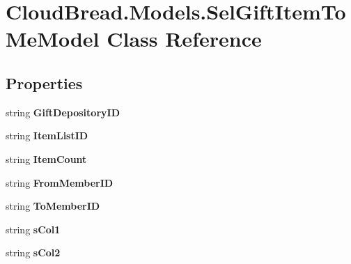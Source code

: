 \hypertarget{a00089}{}\section{Cloud\+Bread.\+Models.\+Sel\+Gift\+Item\+To\+Me\+Model Class Reference}
\label{a00089}
\subsection*{Properties}
\begin{DoxyCompactItemize}
\item 
string {\bfseries Gift\+Depository\+ID}\hypertarget{a00089_a2c14e1827340eda64cf1b7a1be8dd4b4}{}\label{a00089_a2c14e1827340eda64cf1b7a1be8dd4b4}

\item 
string {\bfseries Item\+List\+ID}\hypertarget{a00089_a27e83cbb78e8474c5dbb5faad379be31}{}\label{a00089_a27e83cbb78e8474c5dbb5faad379be31}

\item 
string {\bfseries Item\+Count}\hypertarget{a00089_a0c5ef1ad49d1e85aa334780eb1ba53cb}{}\label{a00089_a0c5ef1ad49d1e85aa334780eb1ba53cb}

\item 
string {\bfseries From\+Member\+ID}\hypertarget{a00089_a7c2c396154b44880846c66dd287bbfe2}{}\label{a00089_a7c2c396154b44880846c66dd287bbfe2}

\item 
string {\bfseries To\+Member\+ID}\hypertarget{a00089_abd4bf67285b03915c980274c0d3e2072}{}\label{a00089_abd4bf67285b03915c980274c0d3e2072}

\item 
string {\bfseries s\+Col1}\hypertarget{a00089_a8715413b8b1e83e8cfc5ca1b5156a404}{}\label{a00089_a8715413b8b1e83e8cfc5ca1b5156a404}

\item 
string {\bfseries s\+Col2}\hypertarget{a00089_a8771b22075a739c8083f47401b646b94}{}\label{a00089_a8771b22075a739c8083f47401b646b94}


\end{DoxyCompactItemize}
